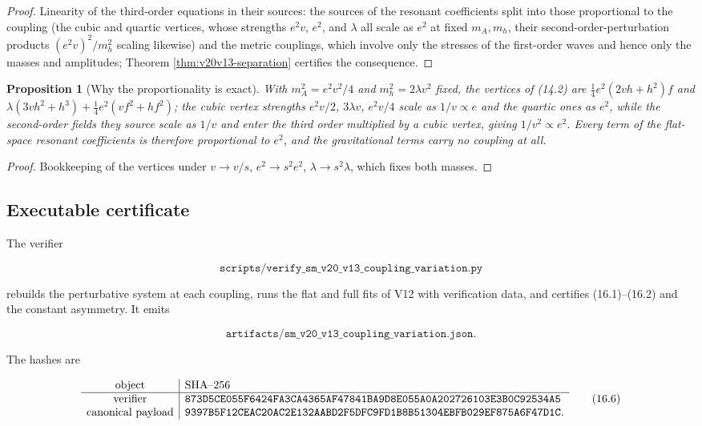 \documentclass[11pt]{article}
\newtheorem{proposition}[theorem]{Proposition}
\theoremstyle{remark}
\begin{document}
\begin{proof}
Linearity of the third-order equations in their sources: the sources
of the resonant coefficients split into those proportional to the
coupling (the cubic and quartic vertices, whose strengths \(e^2v\),
\(e^2\), and \(\lambda\) all scale as \(e^2\) at fixed \(m_A,m_h\), their
second-order-perturbation products \((e^2v)^2/m_h^2\) scaling likewise)
and the metric couplings, which involve only the stresses of the
first-order waves and hence only the masses and amplitudes; Theorem
\ref{thm:v20v13-separation} certifies the consequence.
\end{proof}

\begin{proposition}[Why the proportionality is exact]
\label{prop:v20v13-why}
With \(m_A^2=e^2v^2/4\) and \(m_h^2=2\lambda v^2\) fixed, the vertices
of (14.2) are \(\tfrac14e^2(2vh+h^2)f\) and
\(\lambda(3vh^2+h^3)+\tfrac14e^2(vf^2+hf^2)\); the cubic vertex
strengths \(e^2v/2\), \(3\lambda v\), \(e^2v/4\) scale as \(1/v\propto e\)
and the quartic ones as \(e^2\), while the second-order fields they
source scale as \(1/v\) and enter the third order multiplied by a
cubic vertex, giving \(1/v^2\propto e^2\).  Every term of the
flat-space resonant coefficients is therefore proportional to
\(e^2\), and the gravitational terms carry no coupling at all.
\end{proposition}

\begin{proof}
Bookkeeping of the vertices under \(v\to v/s\), \(e^2\to s^2e^2\),
\(\lambda\to s^2\lambda\), which fixes both masses.
\end{proof}

\subsection{Executable certificate}

The verifier

\[
 \texttt{scripts/verify\_sm\_v20\_v13\_coupling\_variation.py}        \tag{16.4}
\]

rebuilds the perturbative system at each coupling, runs the flat and
full fits of V12 with verification data, and certifies (16.1)--(16.2)
and the constant asymmetry.  It emits

\[
 \texttt{artifacts/sm\_v20\_v13\_coupling\_variation.json}.           \tag{16.5}
\]

The hashes are

\[
\begin{array}{c|l}
\hbox{object}&\hbox{SHA--256}\\ \hline
\hbox{verifier}&
\texttt{873D5CE055F6424FA3CA4365AF47841BA9D8E055A0A202726103E3B0C92534A5}\\
\hbox{canonical payload}&
\texttt{9397B5F12CEAC20AC2E132AABD2F5DFC9FD1B8B51304EBFB029EF875A6F47D1C}.
\end{array}                                                     \tag{16.6}
\]
\end{document}
